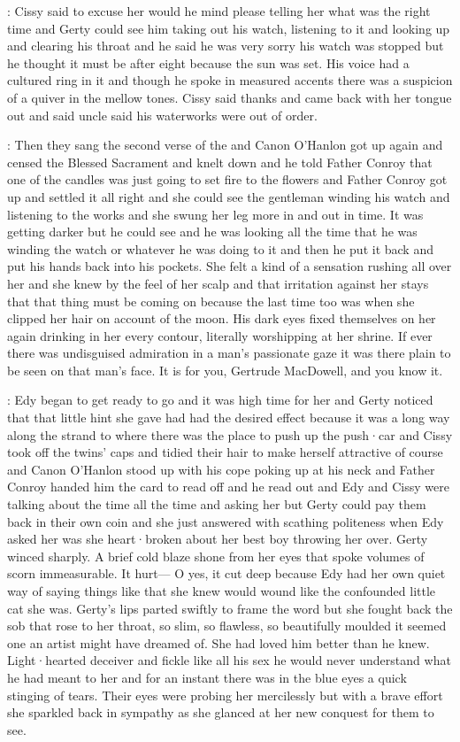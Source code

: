 :
Cissy said
to excuse her
would he mind
please telling her
what was the right time
and Gerty could see him
taking out his watch,
listening to it
and looking up
and clearing his throat
and he said he was very sorry
his watch was stopped
but he thought it must be after eight
because the sun was set.
His voice had a cultured ring in it
and though he spoke in measured accents
there was a suspicion of a quiver
in the mellow tones.
Cissy said thanks
and came back with her tongue out
and said
uncle said
his waterworks were out of order.

:
Then they sang the second verse of the 
and Canon O'Hanlon got up again
and censed the Blessed Sacrament
and knelt down
and he told Father Conroy
that one of the candles
was just going to set fire to the flowers
and Father Conroy got up
and settled it all right
and she could see the gentleman
winding his watch
and listening to the works
and she swung her leg more
in and out in time.
It was getting darker
but he could see
and he was looking all the time
that he was winding the watch
or whatever he was doing to it
and then he put it back
and put his hands back into his pockets.
She felt a kind of a sensation
rushing all over her
and she knew by the feel of her scalp
and that irritation against her stays that
that thing must be coming on
because the last time too
was when she clipped her hair
on account of the moon.
His dark eyes fixed themselves on her again
drinking in her every contour,
literally worshipping at her shrine.
If ever there was undisguised admiration
in a man's passionate gaze
it was there
plain to be seen
on that man's face.
It is for you,
Gertrude MacDowell,
and you know it.

:
Edy began to get ready to go
and it was high time for her
and Gerty noticed that
that little hint she gave
had had the desired effect
because it was a long way
along the strand
to where there was the place
to push up the push·car
and Cissy took off the twins' caps
and tidied their hair
to make herself attractive of course
and Canon O'Hanlon stood up
with his cope poking up at his neck
and Father Conroy handed him the card to read off
and he read out 
and Edy and Cissy were talking
about the time
all the time
and asking her
but Gerty could pay them back in their own coin
and she just answered
with scathing politeness
when Edy asked her
was she heart·broken
about her best boy throwing her over.
Gerty winced sharply.
A brief cold blaze
shone from her eyes
that spoke volumes of scorn immeasurable.
It hurt—%
O yes,
it cut deep
because Edy had her own quiet way
of saying things like that
she knew would wound
like the confounded little cat
she was.
Gerty's lips parted swiftly
to frame the word
but she fought back the sob
that rose to her throat,
so slim,
so flawless,
so beautifully moulded
it seemed one
an artist might have dreamed of.
She had loved him better than he knew.
Light·hearted deceiver
and fickle like all his sex
he would never understand
what he had meant to her
and for an instant
there was
in the blue eyes
a quick stinging of tears.
Their eyes were probing her mercilessly
but with a brave effort
she sparkled back in sympathy
as she glanced at her new conquest
for them to see.

